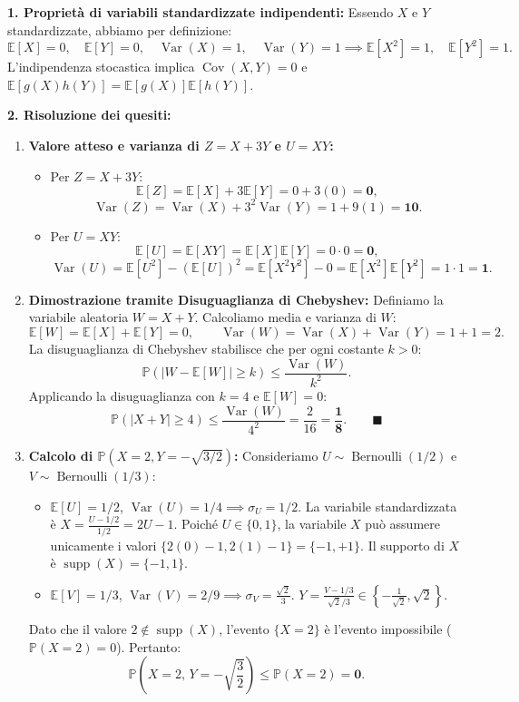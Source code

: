 \documentclass[11pt,a4paper]{article}
\newcommand{\EE}{\mathbb{E}}
\newcommand{\Prob}{\mathbb{P}}
\newcommand{\Var}{\operatorname{Var}}
\newcommand{\Cov}{\operatorname{Cov}}
\begin{document}
\begin{soluzionebox}
\textbf{1. Proprietà di variabili standardizzate indipendenti:}
Essendo $X$ e $Y$ standardizzate, abbiamo per definizione:
\[
\EE[X] = 0, \quad \EE[Y] = 0, \quad \Var(X) = 1, \quad \Var(Y) = 1 \implies \EE[X^2] = 1, \quad \EE[Y^2] = 1.
\]
L'indipendenza stocastica implica $\Cov(X,Y) = 0$ e $\EE[g(X)h(Y)] = \EE[g(X)]\EE[h(Y)]$.

\textbf{2. Risoluzione dei quesiti:}
\begin{enumerate}[label=(\roman*)]
    \item \textbf{Valore atteso e varianza di $Z = X+3Y$ e $U = XY$:}
    \begin{itemize}
        \item Per $Z = X + 3Y$:
        \[
        \EE[Z] = \EE[X] + 3\EE[Y] = 0 + 3(0) = \bm{0},
        \]
        \[
        \Var(Z) = \Var(X) + 3^2 \Var(Y) = 1 + 9(1) = \bm{10}.
        \]
        \item Per $U = XY$:
        \[
        \EE[U] = \EE[XY] = \EE[X]\EE[Y] = 0 \cdot 0 = \bm{0},
        \]
        \[
        \Var(U) = \EE[U^2] - (\EE[U])^2 = \EE[X^2 Y^2] - 0 = \EE[X^2]\EE[Y^2] = 1 \cdot 1 = \bm{1}.
        \]
    \end{itemize}

    \item \textbf{Dimostrazione tramite Disuguaglianza di Chebyshev:}
    Definiamo la variabile aleatoria $W = X + Y$.
    Calcoliamo media e varianza di $W$:
    \[
    \EE[W] = \EE[X] + \EE[Y] = 0, \qquad \Var(W) = \Var(X) + \Var(Y) = 1 + 1 = 2.
    \]
    La disuguaglianza di Chebyshev stabilisce che per ogni costante $k > 0$:
    \[
    \Prob(|W - \EE[W]| \ge k) \le \frac{\Var(W)}{k^2}.
    \]
    Applicando la disuguaglianza con $k = 4$ e $\EE[W]=0$:
    \[
    \Prob(|X + Y| \ge 4) \le \frac{\Var(W)}{4^2} = \frac{2}{16} = \bm{\frac{1}{8}}. \qquad \blacksquare
    \]

    \item \textbf{Calcolo di $\Prob(X=2, Y=-\sqrt{3/2})$:}
    Consideriamo $U \sim \operatorname{Bernoulli}(1/2)$ e $V \sim \operatorname{Bernoulli}(1/3)$:
    \begin{itemize}
        \item $\EE[U] = 1/2$, $\Var(U) = 1/4 \implies \sigma_U = 1/2$.
        La variabile standardizzata è $X = \frac{U - 1/2}{1/2} = 2U - 1$.
        Poiché $U \in \{0, 1\}$, la variabile $X$ può assumere unicamente i valori $\{2(0)-1, 2(1)-1\} = \{-1, +1\}$.
        Il supporto di $X$ è $\operatorname{supp}(X) = \{-1, 1\}$.
        \item $\EE[V] = 1/3$, $\Var(V) = 2/9 \implies \sigma_V = \frac{\sqrt{2}}{3}$.
        $Y = \frac{V - 1/3}{\sqrt{2}/3} \in \left\{ -\frac{1}{\sqrt{2}}, \sqrt{2} \right\}$.
    \end{itemize}
    Dato che il valore $2 \notin \operatorname{supp}(X)$, l'evento $\{X = 2\}$ è l'evento impossibile ($\Prob(X=2) = 0$).
    Pertanto:
    \[
    \Prob\left(X=2, \, Y=-\sqrt{\frac{3}{2}}\right) \le \Prob(X = 2) = \bm{0}.
    \]
\end{enumerate}
\end{soluzionebox}
\end{document}
